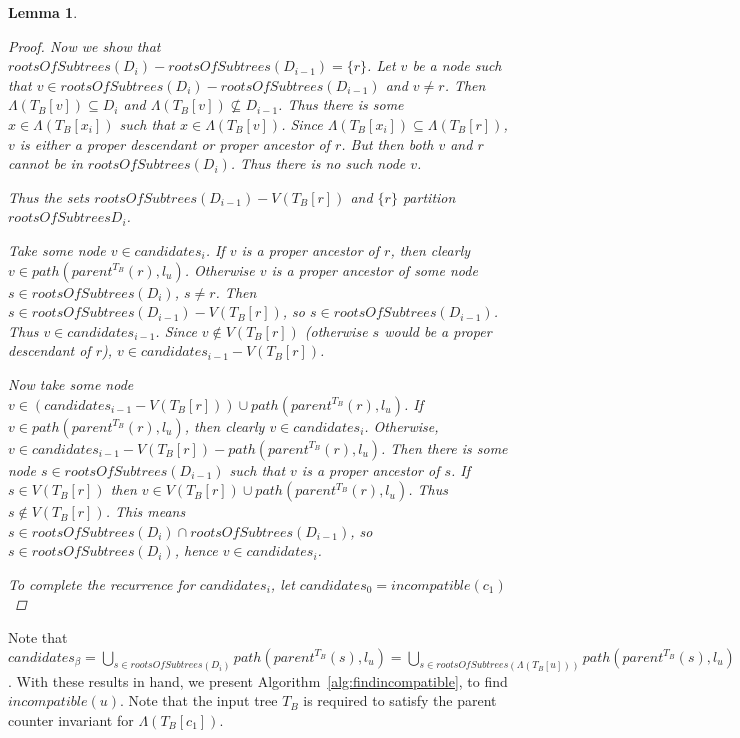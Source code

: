 \documentclass{article}
\newcommand{\leafset}{\Lambda}
\newtheorem{incompatiblecandidates}[incompatibility]{Lemma}
\begin{document}
\begin{incompatiblecandidates}
\begin{proof}
            Now we show that $rootsOfSubtrees(D_i) - rootsOfSubtrees(D_{i-1}) = \{r\}$. Let $v$ be a node such that $v \in rootsOfSubtrees(D_i) - rootsOfSubtrees(D_{i-1})$ and $v \neq r$. Then $\leafset(T_B[v]) \subseteq D_i$ and $\leafset(T_B[v]) \not\subseteq D_{i-1}$. Thus there is some $x \in \leafset(T_B[x_i])$ such that $x \in \leafset(T_B[v])$. Since $\leafset(T_B[x_i]) \subseteq \leafset(T_B[r])$, $v$ is either a proper descendant or proper ancestor of $r$. But then both $v$ and $r$ cannot be in $rootsOfSubtrees(D_i)$. Thus there is no such node $v$.

            Thus the sets $rootsOfSubtrees(D_{i-1}) - V(T_B[r])$ and $\{r\}$ partition $rootsOfSubtrees{D_i}$.

            Take some node $v \in candidates_i$. If $v$ is a proper ancestor of $r$, then clearly $v \in path(parent^{T_B}(r), l_u)$. Otherwise $v$ is a proper ancestor of some node $s \in rootsOfSubtrees(D_i)$, $s \neq r$. Then $s \in rootsOfSubtrees(D_{i-1}) - V(T_B[r])$, so $s \in rootsOfSubtrees(D_{i-1})$. Thus $v \in candidates_{i-1}$. Since $v \not\in V(T_B[r])$ (otherwise $s$ would be a proper descendant of $r$), $v \in candidates_{i-1} - V(T_B[r])$.

            Now take some node $v \in (candidates_{i-1} - V(T_B[r])) \cup path(parent^{T_B}(r), l_u)$. If $v \in path(parent^{T_B}(r), l_u)$, then clearly $v \in candidates_i$. Otherwise, $v \in candidates_{i-1} - V(T_B[r]) - path(parent^{T_B}(r), l_u)$. Then there is some node $s \in rootsOfSubtrees(D_{i-1})$ such that $v$ is a proper ancestor of $s$. If $s \in V(T_B[r])$ then $v \in V(T_B[r]) \cup path(parent^{T_B}(r), l_u)$. Thus $s \not\in V(T_B[r])$. This means $s \in rootsOfSubtrees(D_i) \cap rootsOfSubtrees(D_{i-1})$, so $s \in rootsOfSubtrees(D_i)$, hence $v \in candidates_i$.

            To complete the recurrence for $candidates_i$, let $candidates_0 = incompatible(c_1)$
        \end{proof}
    \end{incompatiblecandidates}

    Note that $candidates_{\beta} = \bigcup_{s \in rootsOfSubtrees(D_i)} path(parent^{T_B}(s), l_u) = \bigcup_{s \in rootsOfSubtrees(\leafset(T_B[u]))} path(parent^{T_B}(s), l_u) = incompatible(u)$. With these results in hand, we present Algorithm~\ref{alg:findincompatible}, to find $incompatible(u)$. Note that the input tree $T_B$ is required to satisfy the parent counter invariant for $\leafset(T_B[c_1])$.
\end{document}
